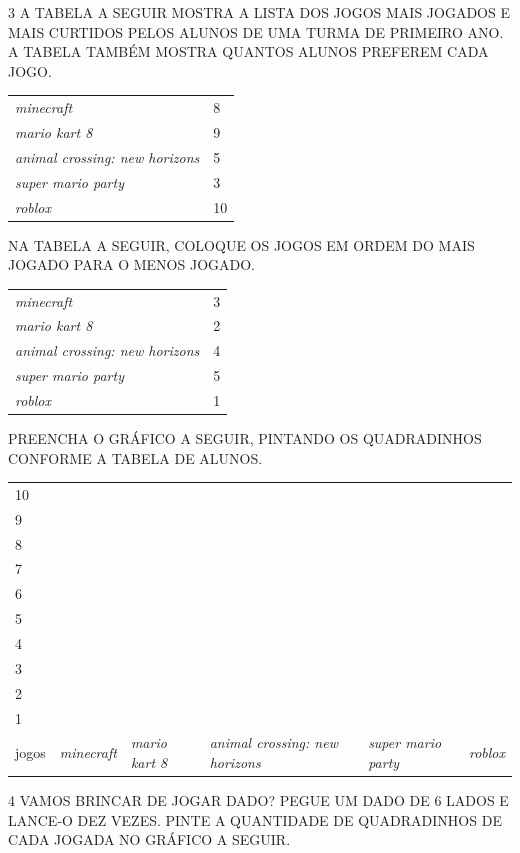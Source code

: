 \num{3} A TABELA A SEGUIR MOSTRA A LISTA DOS JOGOS MAIS JOGADOS E MAIS CURTIDOS PELOS
ALUNOS DE UMA TURMA DE PRIMEIRO ANO. A TABELA TAMBÉM MOSTRA QUANTOS ALUNOS PREFEREM CADA
JOGO.

\begin{longtable}[]{@{}ll@{}}
\toprule
\emph{minecraft} & 8\tabularnewline
\emph{mario kart 8} & 9\tabularnewline
\emph{animal crossing: new horizons} & 5\tabularnewline
\emph{super mario party} & 3\tabularnewline
\emph{roblox} & 10\tabularnewline
\bottomrule
\end{longtable}

\begin{escolha}
\item NA TABELA A SEGUIR, COLOQUE OS JOGOS EM ORDEM DO MAIS JOGADO PARA O MENOS JOGADO.

\begin{longtable}[]{@{}ll@{}}
\toprule
\emph{minecraft} & 3\tabularnewline
\emph{mario kart 8} & 2\tabularnewline
\emph{animal crossing: new horizons} & 4\tabularnewline
\emph{super mario party} & 5\tabularnewline
\emph{roblox} & 1\tabularnewline
\bottomrule
\end{longtable}

\item PREENCHA O GRÁFICO A SEGUIR, PINTANDO OS QUADRADINHOS CONFORME A TABELA DE ALUNOS.

\begin{longtable}[]{@{}llllll@{}}
\toprule
10 & & & & &\tabularnewline
9 & & & & &\tabularnewline
8 & & & & &\tabularnewline
7 & & & & &\tabularnewline
6 & & & & &\tabularnewline
5 & & & & &\tabularnewline
4 & & & & &\tabularnewline
3 & & & & &\tabularnewline
2 & & & & &\tabularnewline
1 & & & & &\tabularnewline
jogos & \emph{minecraft} & \emph{mario kart 8} & \emph{animal crossing:
new horizons} & \emph{super mario party} & \emph{roblox}\tabularnewline
\bottomrule
\end{longtable}

\end{escolha}


\num{4} VAMOS BRINCAR DE JOGAR DADO? PEGUE UM DADO DE 6 LADOS E LANCE-O DEZ
VEZES. PINTE A QUANTIDADE DE QUADRADINHOS DE CADA JOGADA NO GRÁFICO
A SEGUIR.

